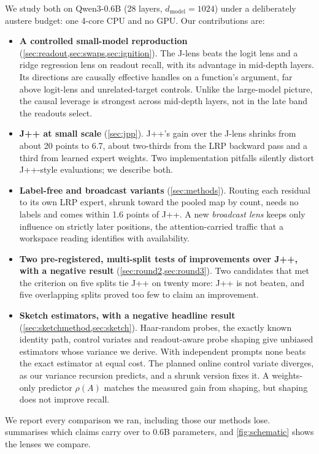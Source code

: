 \documentclass[11pt]{article}
\theoremstyle{definition}
\begin{document}
We study both on Qwen3-0.6B \citep{qwen3} (28 layers, $d_{\text{model}}=1024$) under a deliberately
austere budget: one 4-core CPU and no GPU. Our contributions are:
\begin{itemize}
\item \textbf{A controlled small-model reproduction} (\cref{sec:readout,sec:swaps,sec:ignition}).
The J-lens beats the logit lens and a ridge regression lens on readout recall, with its advantage in
mid-depth layers. Its directions are causally effective handles on a function's argument, far above
logit-lens and unrelated-target controls. Unlike the large-model picture, the causal leverage is
strongest across mid-depth layers, not in the late band the readouts select.
\item \textbf{J++ at small scale} (\cref{sec:jpp}). J++'s gain over the J-lens shrinks from about
20 points to 6.7, about two-thirds from the LRP backward pass and a third from learned expert
weights. Two implementation pitfalls silently distort J++-style evaluations; we describe both.
\item \textbf{Label-free and broadcast variants} (\cref{sec:methods}). Routing each residual to its
own LRP expert, shrunk toward the pooled map by count, needs no labels and comes within 1.6 points of
J++. A new
\emph{broadcast lens} keeps only influence on strictly later positions, the attention-carried traffic
that a workspace reading identifies with availability.
\item \textbf{Two pre-registered, multi-split tests of improvements over J++, with a negative
result} (\cref{sec:round2,sec:round3}). Two candidates that met the criterion on five splits tie J++ on
twenty more: J++ is not beaten, and five overlapping splits proved too few to claim an improvement.
\item \textbf{Sketch estimators, with a negative headline result} (\cref{sec:sketchmethod,sec:sketch}).
Haar-random probes, the exactly known identity path, control variates and readout-aware probe shaping
give unbiased estimators whose variance we derive. With independent prompts none beats the exact
estimator at equal cost. The planned online control variate diverges, as our variance recursion
predicts, and a shrunk version fixes it. A weights-only predictor $\rho(A)$ matches the measured
gain from shaping, but shaping does not improve recall.
\end{itemize}
We report every comparison we ran, including those our methods lose.  summarises
which claims carry over to 0.6B parameters, and \cref{fig:schematic} shows the lenses we compare.
\end{document}
